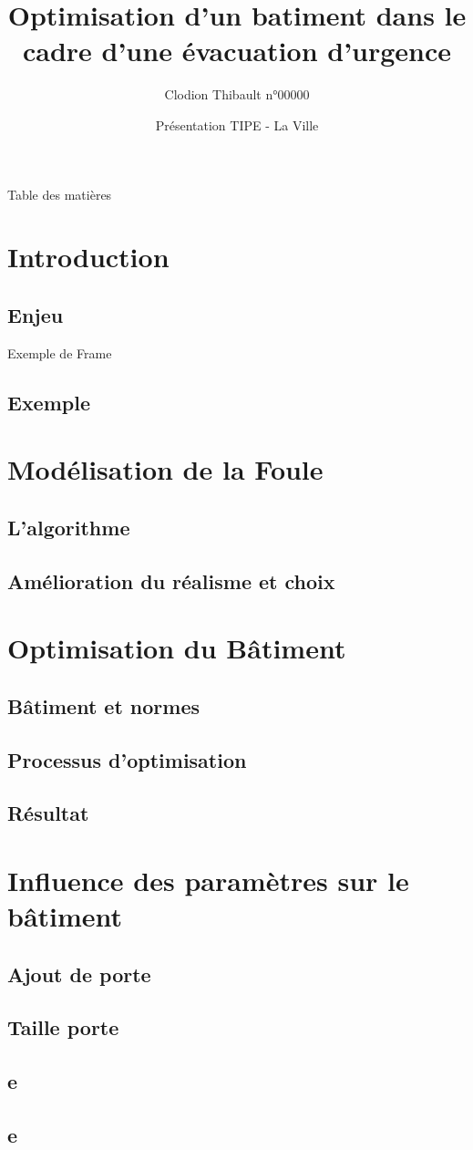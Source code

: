 \documentclass{beamer}
\title{Optimisation d’un batiment dans le cadre
d’une évacuation d’urgence}
\author{Clodion Thibault n°00000}
\date{Présentation TIPE - La Ville}
\begin{document}
\frame{\titlepage} %

\begin{frame}{Table des matières}
    \tableofcontents
\end{frame}

\section{Introduction}

\subsection{Enjeu}

\begin{frame}
    Exemple de Frame
\end{frame}

\subsection{Exemple}

\section{Modélisation de la Foule}
\subsection{L'algorithme}
\subsection{Amélioration du réalisme et choix}

\section{Optimisation du Bâtiment}
\subsection{Bâtiment et normes}
\subsection{Processus d'optimisation}
\subsection{Résultat}

\section{Influence des paramètres sur le bâtiment}
\subsection{Ajout de porte}
\subsection{Taille porte}
\subsection{e}
\subsection{e}


\begin{frame}
\end{frame}
\end{document}
